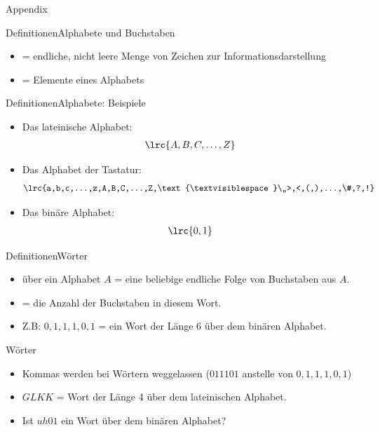 \begin{frame}{Appendix}
\end{frame}

\begin{frame}{Definitionen}{Alphabete und Buchstaben}
\begin{itemize}[<+->]
\item {} = endliche, nicht leere
Menge von Zeichen zur Informationsdarstellung
\item {} = Elemente eines Alphabets
\end{itemize}
\end{frame}


\begin{frame}{Definitionen}{Alphabete: Beispiele}
\begin{itemize}[<+->]
\item
Das lateinische Alphabet:
\begin{align*}
    \lrc{A,B,C,\dots, Z}
\end{align*}
\item
Das Alphabet der Tastatur:
\begin{align*}
    \lrc{a,b,c,...,z,A,B,C,...,Z,\text{\textvisiblespace}\,,>,<,(,),...,\#,?,!}
\end{align*}
\item Das binäre Alphabet:
\begin{align*}
    \lrc{0,1}
\end{align*}

\end{itemize}
\end{frame}

\begin{frame}{Definitionen}{Wörter}
\begin{itemize}[<+->]
    \item {} über ein Alphabet $A$ = eine beliebige endliche Folge von Buchstaben aus $A$. 
    \item {} = die Anzahl der Buchstaben in diesem Wort.
    \item Z.B: $0,1,1,1,0,1$ = ein Wort der Länge 6 über dem binären Alphabet.
\end{itemize}
\end{frame}

\begin{frame}{Wörter}
\begin{itemize}[<+->]
    \item Kommas werden bei Wörtern weggelassen ($011101$ anstelle von $0,1,1,1,0,1$)
    \item $GLKK$ = Wort der Länge 4 über dem lateinischen Alphabet.
    \item Ist $uh01$ ein Wort über dem binären Alphabet?
\end{itemize}
\end{frame}